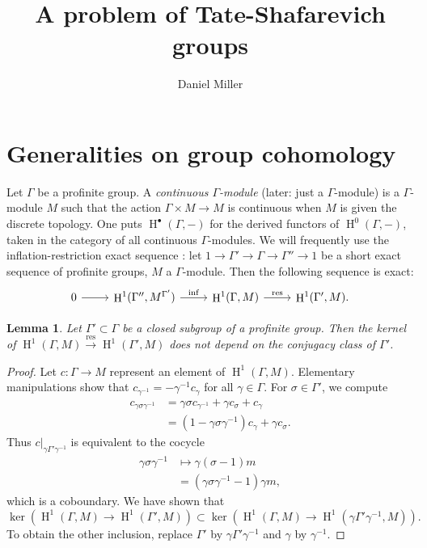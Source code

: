 \documentclass{article}
\title{A problem of Tate-Shafarevich groups}
\author{Daniel Miller}
\DeclareMathOperator{\h}{H}
\DeclareMathOperator{\inflate}{inf}
\DeclareMathOperator{\restrict}{res}
\newtheorem{lemma}{Lemma}
\begin{document}
\maketitle





\section{Generalities on group cohomology}

Let $\Gamma$ be a profinite group. A \emph{continuous $\Gamma$-module} (later: 
just a $\Gamma$-module) is a $\Gamma$-module $M$ such that the action 
$\Gamma\times M\to M$ is continuous when $M$ is given the discrete topology. 
One puts $\h^\bullet(\Gamma,-)$ for the derived functors of $\h^0(\Gamma,-)$, 
taken in the category of all continuous $\Gamma$-modules. We will frequently 
use the inflation-restriction exact sequence \cite[1.6.7]{nsw08}: let 
$1\to \Gamma'\to \Gamma\to \Gamma''\to 1$ be a short exact sequence of profinite 
groups, $M$ a $\Gamma$-module. Then the following sequence is exact:
\[
\begin{tikzcd}
  0 \ar[r] 
    & \h^1(\Gamma'',M^{\Gamma'}) \ar[r, "\inflate"]
    & \h^1(\Gamma,M) \ar[r, "\restrict"]
    & \h^1(\Gamma',M) .
\end{tikzcd}
\]

\begin{lemma}
Let $\Gamma'\subset \Gamma$ be a closed subgroup of a profinite group. Then the 
kernel of $\h^1(\Gamma,M)\xrightarrow{\restrict}\h^1(\Gamma',M)$ does not 
depend on the conjugacy class of $\Gamma'$. 
\end{lemma}
\begin{proof}
Let $c:\Gamma\to M$ represent an element of $\h^1(\Gamma,M)$. Elementary 
manipulations show that $c_{\gamma^{-1}} = -\gamma^{-1} c_\gamma$ for all 
$\gamma\in \Gamma$. For $\sigma\in \Gamma'$, we compute 
\begin{align*}
  c_{\gamma\sigma\gamma^{-1}} 
    &= \gamma\sigma c_{\gamma^{-1}} + \gamma c_\sigma + c_\gamma \\
    &= (1-\gamma\sigma\gamma^{-1})c_\gamma + \gamma c_\sigma .
\end{align*}
Thus $c|_{\gamma \Gamma'\gamma^{-1}}$ is equivalent to the cocycle 
\begin{align*}
  \gamma\sigma\gamma^{-1} &\mapsto \gamma(\sigma-1) m \\
    &= (\gamma\sigma\gamma^{-1}-1)\gamma m ,
\end{align*}
which is a coboundary. We have shown that 
\[
  \ker\left(\h^1(\Gamma,M)\to \h^1(\Gamma',M)\right) \subset \ker\left(\h^1(\Gamma,M)\to \h^1(\gamma\Gamma'\gamma^{-1},M)\right) .
\]
To obtain the other inclusion, replace $\Gamma'$ by 
$\gamma \Gamma'\gamma^{-1}$ and $\gamma$ by $\gamma^{-1}$. 
\end{proof}
\end{document}
